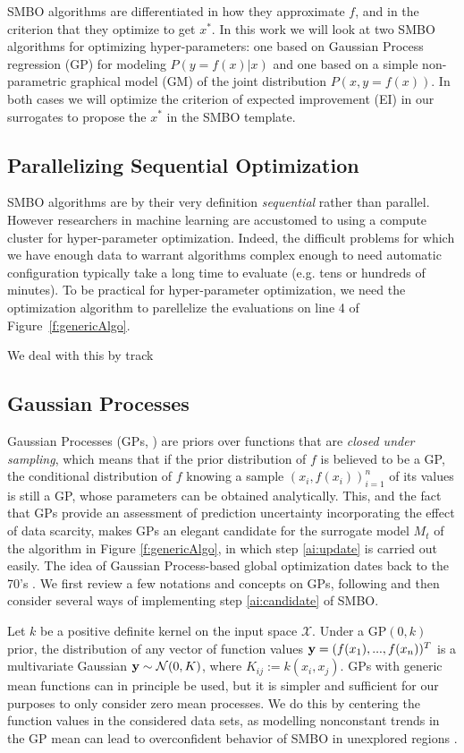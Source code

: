 \documentclass{article}
\newcommand{\vs}[1]{\vspace*{-#1mm}}
\newcommand{\Bs}{\vs{2}}
\newcommand{\as}{\vs{1}}
\begin{document}
SMBO algorithms are differentiated in how they approximate $f$,
and in the criterion that they optimize to get $x^*$.
In this work we will look at two SMBO algorithms for optimizing hyper-parameters:
one based on Gaussian Process regression (GP) for modeling $P(y=f(x)|x)$ and one based on a simple non-parametric graphical model (GM) of the
joint distribution $P(x,y=f(x))$.
In both cases we will optimize the criterion of expected improvement (EI) in
our surrogates to propose the $x^*$ in the SMBO template.

\subsection{Parallelizing Sequential Optimization}

SMBO algorithms are by their very definition {\em sequential} rather than parallel.
However researchers in machine learning are accustomed to using a compute cluster
for hyper-parameter optimization.
Indeed, the difficult problems for which we have enough data to warrant algorithms complex enough
to need automatic configuration typically take a long time to evaluate (e.g. tens or hundreds of minutes).
To be practical for hyper-parameter optimization,
we need the optimization algorithm to parellelize the evaluations on line 4 of
Figure~\ref{f:genericAlgo}.

We deal with this by track


\Bs
\subsection{Gaussian Processes}
\as
\label{ss:GPs}
Gaussian Processes (GPs, \cite{RaWi06}) are priors over functions that are
{\it closed under sampling}, which means that if the prior
distribution of $f$ is believed to be a GP, the conditional
distribution of $f$ knowing a sample $(x_i,f(x_i))_{i=1}^n$ of its
values is still a GP, whose parameters can be obtained
analytically. This, and the fact that GPs provide an assessment of
prediction uncertainty incorporating the effect of data scarcity, 
makes GPs an elegant candidate for the surrogate
model $M_t$ of the algorithm in Figure \ref{f:genericAlgo}, in which
step \ref{ai:update} is carried out easily. The idea of Gaussian
Process-based global optimization dates back to the 70's
\cite{MoTiZi78}. We first review a few notations and concepts on GPs,
following \cite{RaWi06} and then consider several ways of implementing
step \ref{ai:candidate} of SMBO.

Let $k$ be a positive definite kernel on the input space
$\mathcal{X}$. Under a $\text{GP}(0,k)$ prior, the distribution of any
vector of function values ${\bf y}=(f(x_1), ... , f(x_n))^{T}$ is a
multivariate Gaussian ${\bf y} \sim \mathcal{N}(0,K)$, where 
$K_{ij}:=k(x_i,x_j)$. GPs with
generic mean functions can in principle be used, but it is simpler
and sufficient for our purposes to only consider zero mean processes.
We do this by
centering the function values in the considered data sets, as modelling
nonconstant trends in the GP mean can lead to
overconfident behavior of SMBO in unexplored regions \cite{GiDuBaCaRo09}.
\end{document}
